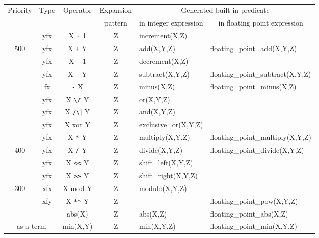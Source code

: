 \def\M#1{\multicolumn{2}{|c|}{#1}}
\begin{table}[t]
\begin{center}\
\begin{tabular}{|c|c|c|c|l|l|}\hline
Priority & Type & Operator & Expansion
& \multicolumn{2}{c|}{Generated built-in predicate}\\ \cline{5-6}
       &    &          &pattern
&\multicolumn{1}{c|}{in integer expression}
&\multicolumn{1}{c|}{in floating point expression} \\ \hline\hline
    & yfx & X \verb|+| 1      & Z & increment(X,Z)                  &\\
500 & yfx & X \verb|+| Y      & Z & add(X,Y,Z)
                                    & floating_point_add(X,Y,Z)      \\
    & yfx & X \verb|-| 1      & Z & decrement(X,Z)                  &\\
    & yfx & X \verb|-| Y      & Z & subtract(X,Y,Z)
                                    & floating_point_subtract(X,Y,Z) \\
    &  fx & \verb|-| X        & Z & minus(X,Z)
                                    & floating_point_minus(X,Z)      \\
    & yfx & X \verb|\/| Y     & Z & or(X,Y,Z)                       &\\
    & yfx & X \verb|/\| Y     & Z & and(X,Y,Z)                      &\\
    & yfx & X xor Y           & Z & exclusive_or(X,Y,Z)             &\\ \hline
    & yfx & X \verb|*| Y      & Z & multiply(X,Y,Z)
                                    & floating_point_multiply(X,Y,Z) \\
400 & yfx & X \verb|/| Y      & Z & divide(X,Y,Z)
                                    & floating_point_divide(X,Y,Z)   \\
    & yfx & X \verb|<<| Y     & Z & shift_left(X,Y,Z)               &\\
    & yfx & X \verb|>>| Y     & Z & shift_right(X,Y,Z)              &\\ \hline
300 & xfx & X mod Y           & Z & modulo(X,Y,Z)                   &\\
    & xfy & X \verb|**| Y     & Z & & floating_point_pow(X,Y,Z)      \\ \hline
\M{}      & abs(X)            & Z & abs(X,Z)
                                    & floating_point_abs(X,Z)        \\
\M{as a term} & min(X,Y)       & Z & min(X,Y,Z)
                                    & floating_point_min(X,Y,Z)      \\

\end{tabular}
\end{center}
\end{table}
